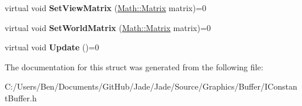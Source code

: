 \begin{DoxyCompactItemize}
\item 
\hypertarget{struct_jade_1_1_graphics_1_1_i_constant_buffer_a259c407613711ee0fd5158f51f492556}{}virtual void {\bfseries Set\+View\+Matrix} (\hyperlink{struct_jade_1_1_math_1_1_matrix}{Math\+::\+Matrix} matrix)=0\label{struct_jade_1_1_graphics_1_1_i_constant_buffer_a259c407613711ee0fd5158f51f492556}

\item 
\hypertarget{struct_jade_1_1_graphics_1_1_i_constant_buffer_a4d7aca82baa2d5a549f87bac337b01db}{}virtual void {\bfseries Set\+World\+Matrix} (\hyperlink{struct_jade_1_1_math_1_1_matrix}{Math\+::\+Matrix} matrix)=0\label{struct_jade_1_1_graphics_1_1_i_constant_buffer_a4d7aca82baa2d5a549f87bac337b01db}

\item 
\hypertarget{struct_jade_1_1_graphics_1_1_i_constant_buffer_ace4b76bd5cd1524562c6ea4abd1a8579}{}virtual void {\bfseries Update} ()=0\label{struct_jade_1_1_graphics_1_1_i_constant_buffer_ace4b76bd5cd1524562c6ea4abd1a8579}

\end{DoxyCompactItemize}


The documentation for this struct was generated from the following file\+:\begin{DoxyCompactItemize}
\item 
C\+:/\+Users/\+Ben/\+Documents/\+Git\+Hub/\+Jade/\+Jade/\+Source/\+Graphics/\+Buffer/I\+Constant\+Buffer.\+h\end{DoxyCompactItemize}
